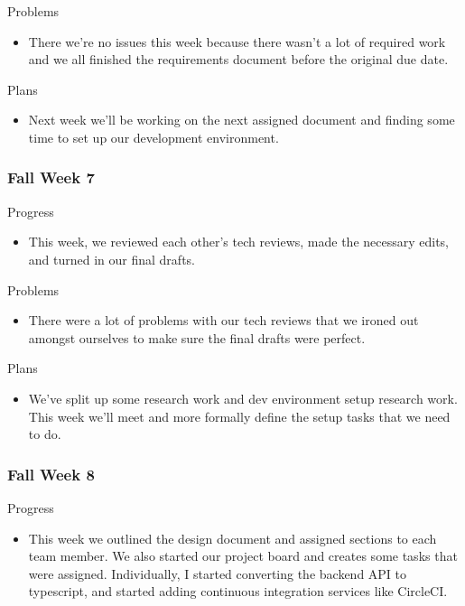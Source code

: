         \noindent
        Problems
        \begin{itemize}
            \item There we’re no issues this week because there wasn’t a lot of required work and we all finished the requirements document before the original due date.
        \end{itemize}
        
        \noindent
        Plans
        \begin{itemize}
            \item Next week we’ll be working on the next assigned document and finding some time to set up our development environment.
        \end{itemize}
    \subsubsection{Fall Week 7}
        \noindent
        Progress
        \begin{itemize}
            \item This week, we reviewed each other’s tech reviews, made the necessary edits, and turned in our final drafts.
        \end{itemize}
        
        \noindent
        Problems
        \begin{itemize}
            \item There were a lot of problems with our tech reviews that we ironed out amongst ourselves to make sure the final drafts were perfect.
        \end{itemize}
        
        \noindent
        Plans
        \begin{itemize}
            \item We’ve split up some research work and dev environment setup research work. This week we’ll meet and more formally define  the setup tasks that we need to do. 
        \end{itemize}
    \subsubsection{Fall Week 8}
        \noindent
        Progress
        \begin{itemize}
            \item This week we outlined the design document and assigned sections to each team member. We also started our project board and creates some tasks that were assigned. Individually, I started converting the backend API to typescript, and started adding continuous integration services like CircleCI.
        \end{itemize}
        
